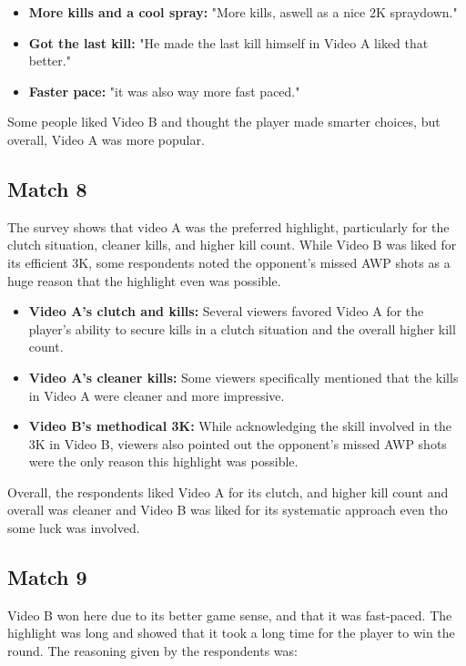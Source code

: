 \begin{itemize}
\item \textbf{More kills and a cool spray:} "More kills, aswell as a nice 2K spraydown."
\item \textbf{Got the last kill:} "He made the last kill himself in Video A liked that better."
\item \textbf{Faster pace:} "it was also way more fast paced."
\end{itemize}

Some people liked Video B and thought the player made smarter choices, but overall, Video A was more popular.


\subsection*{Match 8}
The survey shows that video A was the preferred highlight, particularly for the clutch situation, cleaner kills, and higher kill count. While Video B was liked for its efficient 3K, some respondents noted the opponent's missed AWP shots as a huge reason that the highlight even was possible.

\begin{itemize}
\item \textbf{Video A's clutch and kills:} Several viewers favored Video A for the player's ability to secure kills in a clutch situation and the overall higher kill count.
\item \textbf{Video A's cleaner kills:} Some viewers specifically mentioned that the kills in Video A were cleaner and more impressive.
\item \textbf{Video B's methodical 3K:} While acknowledging the skill involved in the 3K in Video B, viewers also pointed out the opponent's missed AWP shots were the only reason this highlight was possible.
\end{itemize}

Overall, the respondents liked Video A for its clutch, and higher kill count and overall was cleaner and Video B was liked for its systematic approach even tho some luck was involved.


\subsection*{Match 9}
Video B won here due to its better game sense, and that it was fast-paced. The highlight was long and showed that it took a long time for the player to win the round.
The reasoning given by the respondents was:

